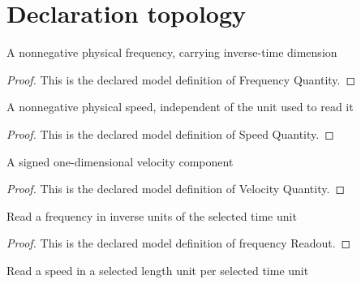 \section{Declaration topology}
\begin{definition}
  \label{def:physics:phyx-mini-0197:phyxminiproblems-problemphyxmini0197-frequencyquantity}
  A nonnegative physical frequency, carrying inverse-time dimension
\end{definition}
\begin{proof}
  This is the declared model definition of Frequency Quantity.
\end{proof}
\begin{definition}
  \label{def:physics:phyx-mini-0197:phyxminiproblems-problemphyxmini0197-speedquantity}
  A nonnegative physical speed, independent of the unit used to read it
\end{definition}
\begin{proof}
  This is the declared model definition of Speed Quantity.
\end{proof}
\begin{definition}
  \label{def:physics:phyx-mini-0197:phyxminiproblems-problemphyxmini0197-velocityquantity}
  A signed one-dimensional velocity component
\end{definition}
\begin{proof}
  This is the declared model definition of Velocity Quantity.
\end{proof}
\begin{definition}
  \label{def:physics:phyx-mini-0197:phyxminiproblems-problemphyxmini0197-frequencyreadout}
  Read a frequency in inverse units of the selected time unit
\end{definition}
\begin{proof}
  This is the declared model definition of frequency Readout.
\end{proof}
\begin{definition}
  \label{def:physics:phyx-mini-0197:phyxminiproblems-problemphyxmini0197-speedreadout}
  Read a speed in a selected length unit per selected time unit
\end{definition}
